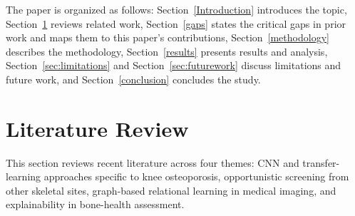 \documentclass[conference]{IEEEtran}
\begin{document}
The paper is organized as follows: Section~\ref{Introduction} introduces the topic, Section~\ref{Literature} reviews related work, Section~\ref{gaps} states the critical gaps in prior work and maps them to this paper's contributions, Section~\ref{methodology} describes the methodology, Section~\ref{results} presents results and analysis, Section~\ref{sec:limitations} and Section~\ref{sec:futurework} discuss limitations and future work, and Section~\ref{conclusion} concludes the study.




\section{Literature Review} \label{Literature}


This section reviews recent literature across four themes: CNN and transfer-learning approaches specific to knee osteoporosis, opportunistic screening from other skeletal sites, graph-based relational learning in medical imaging, and explainability in bone-health assessment.
\end{document}
